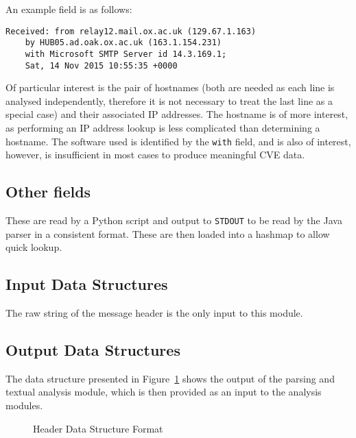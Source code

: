 An example field is as follows:
\begin{verbatim}
Received: from relay12.mail.ox.ac.uk (129.67.1.163)
    by HUB05.ad.oak.ox.ac.uk (163.1.154.231)
    with Microsoft SMTP Server id 14.3.169.1;
    Sat, 14 Nov 2015 10:55:35 +0000
\end{verbatim}

Of particular interest is the pair of hostnames (both are needed as each line is analysed independently, therefore it is not necessary to treat the last line as a special case) and their associated IP addresses.  The hostname is of more interest, as performing an IP address lookup is less complicated than determining a hostname.  The software used is identified by the \texttt{with} field, and is also of interest, however, is insufficient in most cases to produce meaningful CVE data.

\subsection{Other fields}

These are read by a Python script and output to \texttt{STDOUT} to be read by
the Java parser in a consistent format.  These are then loaded into a hashmap to
allow quick lookup.


\subsection{Input Data Structures}
The raw string of the message header is the only input to this module.

\subsection{Output Data Structures}
The data structure presented in Figure~\ref{fig:hea} shows the output of the
parsing and textual analysis module, which is then provided as an input to the
analysis modules.

\begin{figure}
\centering
{}
	\caption{Header Data Structure Format}
	\label{fig:hea}
\end{figure}


